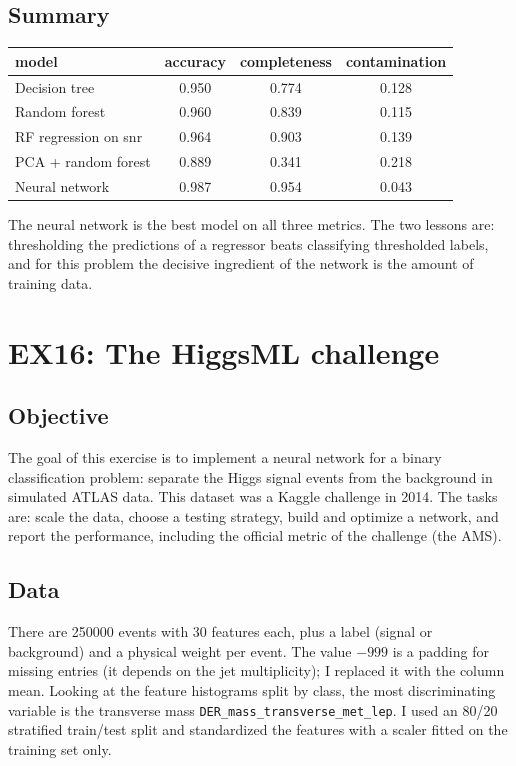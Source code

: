 \documentclass[11pt]{article}
\begin{document}
\subsection*{Summary}

\begin{center}
\begin{tabular}{lccc}
\toprule
model & accuracy & completeness & contamination \\
\midrule
Decision tree & 0.950 & 0.774 & 0.128 \\
Random forest & 0.960 & 0.839 & 0.115 \\
RF regression on snr & 0.964 & 0.903 & 0.139 \\
PCA + random forest & 0.889 & 0.341 & 0.218 \\
Neural network & 0.987 & 0.954 & 0.043 \\
\bottomrule
\end{tabular}
\end{center}

The neural network is the best model on all three metrics. The two lessons are: thresholding the predictions of a regressor beats classifying thresholded labels, and for this problem the decisive ingredient of the network is the amount of training data.

\section{EX16: The HiggsML challenge}

\subsection*{Objective}

The goal of this exercise is to implement a neural network for a binary classification problem: separate the Higgs signal events from the background in simulated ATLAS data. This dataset was a Kaggle challenge in 2014. The tasks are: scale the data, choose a testing strategy, build and optimize a network, and report the performance, including the official metric of the challenge (the AMS).

\subsection*{Data}

There are 250000 events with 30 features each, plus a label (signal or background) and a physical weight per event. The value $-999$ is a padding for missing entries (it depends on the jet multiplicity); I replaced it with the column mean. Looking at the feature histograms split by class, the most discriminating variable is the transverse mass \texttt{DER\_mass\_transverse\_met\_lep}. I used an 80/20 stratified train/test split and standardized the features with a scaler fitted on the training set only.
\end{document}
